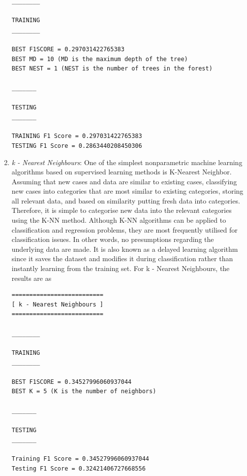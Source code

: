 \documentclass[runningheads]{llncs}
\begin{document}
\begin{enumerate}
\begin{verbatim}
________

TRAINING
________

BEST F1SCORE = 0.297031422765383
BEST MD = 10 (MD is the maximum depth of the tree)
BEST NEST = 1 (NEST is the number of trees in the forest)

_______

TESTING
_______

TRAINING F1 Score = 0.297031422765383
TESTING F1 Score = 0.2863440208450306

\end{verbatim}
\item \textit{k - Nearest Neighbours}: One of the simplest nonparametric machine learning algorithms based on supervised learning methods is K-Nearest Neighbor. Assuming that new cases and data are similar to existing cases, classifying new cases into categories that are most similar to existing categories, storing all relevant data, and based on similarity putting fresh data into categories. Therefore, it is simple to categorise new data into the relevant categories using the K-NN method. Although K-NN algorithms can be applied to classification and regression problems, they are most frequently utilised for classification issues. In other words, no presumptions regarding the underlying data are made. It is also known as a delayed learning algorithm since it saves the dataset and modifies it during classification rather than instantly learning from the training set. For k - Nearest Neighbours, the results are as
\begin{verbatim}
==========================
[ k - Nearest Neighbours ]
==========================

________

TRAINING
________

BEST F1SCORE = 0.34527996060937044
BEST K = 5 (K is the number of neighbors)

_______

TESTING
_______

Training F1 Score = 0.34527996060937044
Testing F1 Score = 0.32421406727668556


\end{verbatim}
\end{enumerate}
\end{document}
